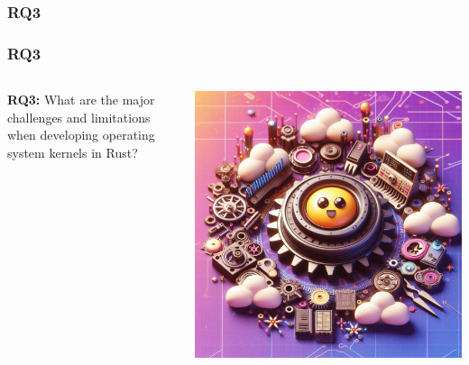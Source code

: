\documentclass{beamer}
\begin{document}
\subsubsection{RQ3}
\begin{frame}
  \frametitle{RQ3}
  \begin{columns}
    \begin{column}{0.5\textwidth}
      \textbf{RQ3:} What are the major challenges and limitations when developing operating system kernels in Rust?
    \end{column}
    \begin{column}{0.5\textwidth}
      \includegraphics[width=.8\textwidth]{images/rq3.jpeg}
    \end{column}
  \end{columns}
\end{frame}
\end{document}
